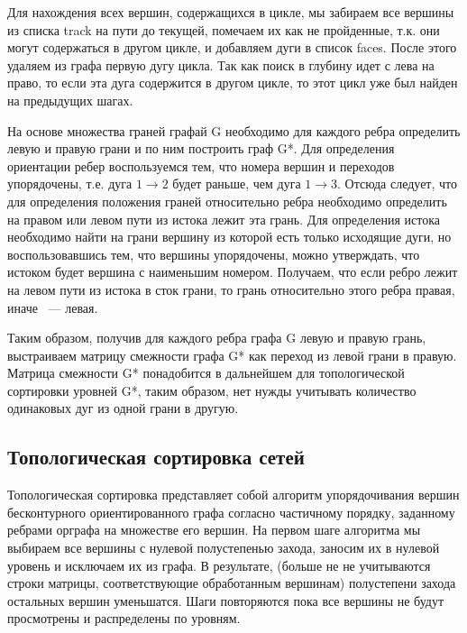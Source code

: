 Для нахождения всех вершин, содержащихся в цикле, мы забираем все вершины из списка track на пути до текущей, помечаем их как не пройденные, т.к. они могут содержаться в другом цикле, и добавляем дуги в список faces. После этого удаляем из графа первую дугу цикла. Так как поиск в глубину идет с лева на право, то если эта дуга содержится в другом цикле, то этот цикл уже был найден на предыдущих шагах. 


На основе множества граней графай G необходимо для каждого ребра определить левую и правую грани и по ним построить граф G*. Для определения ориентации ребер воспользуемся тем, что номера вершин и переходов упорядочены, т.е. дуга $ 1 \rightarrow 2 $ будет раньше, чем дуга $ 1 \rightarrow 3 $. Отсюда следует, что для определения положения граней относительно ребра необходимо определить на правом или левом пути из истока лежит эта грань. Для определения истока необходимо найти на грани вершину из которой есть только исходящие дуги, но воспользовавшись тем, что вершины упорядочены, можно утверждать, что истоком будет вершина с наименьшим номером. Получаем, что если ребро лежит на левом пути из истока в сток грани, то грань относительно этого ребра правая, иначе ~--- левая.


Таким образом, получив для каждого ребра графа G левую и правую грань, выстраиваем матрицу смежности графа G* как переход из левой грани в правую. Матрица смежности G* понадобится в дальнейшем для топологической сортировки уровней G*, таким образом, нет нужды учитывать количество одинаковых дуг из одной грани в другую.

\subsection{Топологическая сортировка сетей}

Топологическая сортировка представляет собой алгоритм упорядочивания вершин бесконтурного ориентированного графа согласно частичному порядку, заданному ребрами орграфа на множестве его вершин. На первом шаге алгоритма мы выбираем все вершины с нулевой полустепенью захода, заносим их в нулевой уровень и исключаем их из графа. В результате, (больше не не учитываются строки матрицы, соответствующие обработанным вершинам) полустепени захода остальных вершин уменьшатся. Шаги повторяются пока все вершины не будут просмотрены и распределены по уровням.

